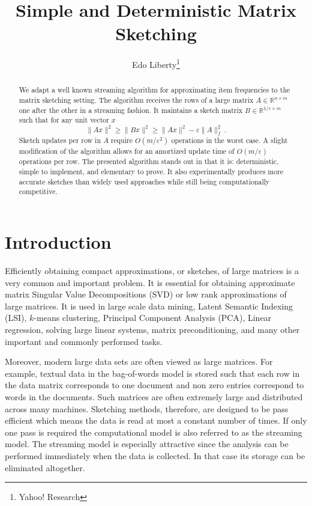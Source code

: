 \documentclass[]{article}
\title{Simple and Deterministic Matrix Sketching}
\author{Edo Liberty\thanks{Yahoo! Research}}
\date{\nonumber}
\newcommand{\R}{{\mathbb R}}
\newcommand{\eps}{\varepsilon}
\begin{document}
\maketitle

\begin{abstract}
We adapt a well known streaming algorithm for approximating item frequencies to the matrix sketching setting. 
The algorithm receives the rows of a large matrix $A \in \R^{n \times m}$ one after the other in a streaming fashion. 
It maintains a sketch matrix $B \in \R^ { 1/\eps  \times m}$ such that for any unit vector $x$
\[
\|Ax\|^2 \ge \|Bx\|^2 \ge  \|Ax\|^2 - \eps \|A\|_{f}^2 \ .
\]
Sketch updates per row in $A$ require $O(m/\eps^2)$ operations in the worst case.
A slight modification of the algorithm allows for an amortized update time of $O(m/\eps)$ operations per row. 
The presented algorithm stands out in that it is: deterministic, simple to implement, and elementary to prove.
It also experimentally produces more accurate sketches than widely used approaches while still being computationally competitive.
\end{abstract}

\section{Introduction}
Efficiently obtaining compact approximations, or sketches, of large matrices is a very common and important problem.
It is essential for obtaining approximate matrix Singular Value Decompositions (SVD) or low rank approximations of large matrices.
It is used in large scale data mining, Latent Semantic Indexing (LSI), $k$-means clustering, Principal Component Analysis (PCA), Linear regression, solving large linear systems, matrix preconditioning, and many other important and commonly performed tasks.

Moreover, modern large data sets are often viewed as large matrices.
For example, textual data in the bag-of-words model is stored such that each row in the data matrix 
corresponds to one document and non zero entries correspond to words in the documents.
Such matrices are often extremely large and distributed across many machines.
Sketching methods, therefore, are designed to be pass efficient which means the data is read at most a constant number of times.
If only one pass is required the computational model is also referred to as the streaming model. 
The streaming model is especially attractive since the analysis can be performed immediately when the data is collected.
In that case its storage can be eliminated altogether. 
\end{document}
